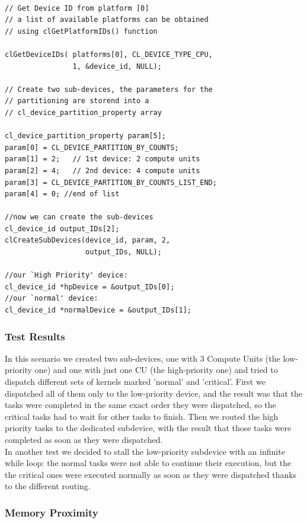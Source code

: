 {\footnotesize\begin{verbatim}

// Get Device ID from platform [0]
// a list of available platforms can be obtained
// using clGetPlatformIDs() function

clGetDeviceIDs( platforms[0], CL_DEVICE_TYPE_CPU,
                1, &device_id, NULL);
								
// Create two sub-devices, the parameters for the
// partitioning are storend into a 
// cl_device_partition_property array

cl_device_partition_property param[5];
param[0] = CL_DEVICE_PARTITION_BY_COUNTS;
param[1] = 2;   // 1st device: 2 compute units
param[2] = 4; 	// 2nd device: 4 compute units
param[3] = CL_DEVICE_PARTITION_BY_COUNTS_LIST_END;
param[4] = 0; //end of list

//now we can create the sub-devices
cl_device_id output_IDs[2]; 
clCreateSubDevices(device_id, param, 2,
                   output_IDs, NULL);
									
//our `High Priority' device:
cl_device_id *hpDevice = &output_IDs[0];  
//our `normal' device:    
cl_device_id *normalDevice = &output_IDs[1]; 

\end{verbatim}}

\subsubsection*{Test Results}
In this scenario we created two sub-devices, one with 3 Compute Units (the low-priority one) and one with just one CU (the high-priority one) and tried to dispatch different sets of kernels marked 'normal' and 'critical'. First we dispatched all of them only to the low-priority device, and the result was that the tasks were completed in the same exact order they were dispatched, so the critical tasks had to wait for other tasks to finish. Then we routed the high priority tasks to the dedicated subdevice, with the result that those tasks were completed as soon as they were dispatched.\\
In another test we decided to stall the low-priority subdevice with an infinite while loop: the normal tasks were not able to continue their execution, but the the critical ones were executed normally as soon as they were dispatched thanks to the different routing.

\subsubsection{Memory Proximity} \label{sect:memproximity}

